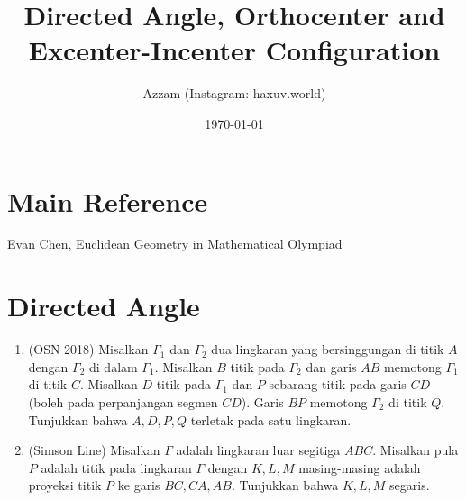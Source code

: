 \documentclass[11pt]{scrartcl}
\title{Directed Angle, Orthocenter and Excenter-Incenter Configuration}
\author{Azzam (Instagram: haxuv.world)}
\date{\today}
\begin{document}
\maketitle

\section{Main Reference}
Evan Chen, Euclidean Geometry in Mathematical Olympiad

\section{Directed Angle}
\begin{enumerate}
    \item (OSN 2018) Misalkan $\Gamma_1$ dan $\Gamma_2$ dua lingkaran yang bersinggungan di titik $A$ dengan $\Gamma_2$ di dalam $\Gamma_1$. Misalkan $B$ titik pada $\Gamma_2$ dan garis $AB$ memotong $\Gamma_1$ di titik $C$. Misalkan $D$ titik pada $\Gamma_1$ dan $P$ sebarang titik pada garis $CD$ (boleh pada perpanjangan segmen $CD$). Garis $BP$ memotong $\Gamma_2$ di titik $Q$. Tunjukkan bahwa $A, D, P, Q$ terletak pada satu lingkaran.

    \item (Simson Line) Misalkan $\Gamma$ adalah lingkaran luar segitiga $ABC$. Misalkan pula $P$ adalah titik pada lingkaran $\Gamma$ dengan $K,L,M$ masing-masing adalah proyeksi titik $P$ ke garis $BC,CA,AB$. Tunjukkan bahwa $K,L,M$ segaris.
\end{enumerate}
\end{document}
